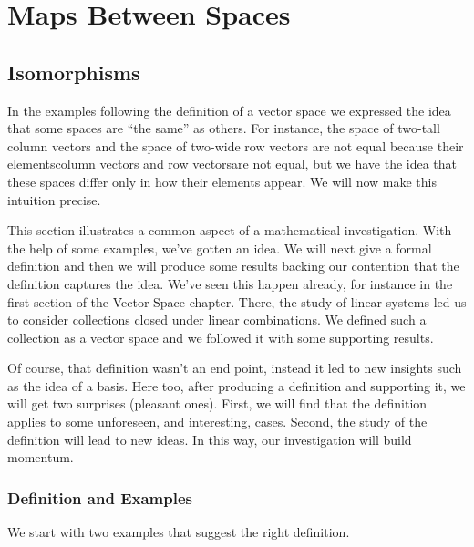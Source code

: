 \chapter{Maps Between Spaces}

\section{Isomorphisms}
In the examples following the definition of a vector space
we expressed the idea that some spaces are ``the same'' as others.
For instance, the space of two-tall column vectors and
the space of two-wide row vectors
are not equal because their 
elements\Dash column vectors and row vectors\Dash are 
not equal, but we have 
the idea that these spaces differ only in how their elements appear.
We will now make this intuition precise.

This section illustrates a common aspect of a mathematical investigation.
With the help of some examples, we've gotten an idea.
We will next give a formal definition and then
we will produce some results backing our contention 
that the definition captures the idea.
We've seen this happen already, 
for instance in the first section of the Vector Space chapter.
There, the study of linear systems
led us to consider collections closed under linear combinations.
We defined such a collection as a vector space and
we followed it with some supporting results.

Of course, that definition wasn't an end point, 
instead it led to new insights such as the idea of a basis.
Here too, after producing a definition and supporting it,
we will get two surprises (pleasant ones).
First, we will find that 
the definition applies to some unforeseen, and interesting, cases.
Second, the study of the definition will lead to new ideas.
In this way, our investigation will build momentum.










\subsection{Def{}inition and Examples}
We start with two examples
that suggest the right definition. 

